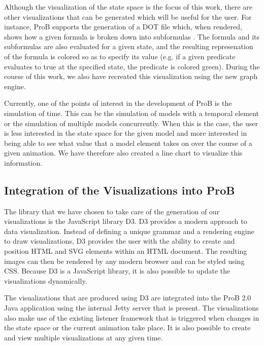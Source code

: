 Although the visualization of the state space is the focus of this work, there are other visualizations that can be generated which will be useful for the user. For instance, ProB supports the generation of a DOT file which, when rendered, shows how a given formula is broken down into subformulas \cite{LeSaBeLu08_228}. The formula and its subformulas are also evaluated for a given state, and the resulting represenation of the formula is colored so as to specify its value (e.g. if a given predicate evaluates to true at the specified state, the predicate is colored green). During the course of this work, we also have recreated this visualization using the new graph engine.

Currently, one of the points of interest in the development of ProB is the simulation of time. This can be the simulation of models with a temporal element or the simulation of multiple models concurrently. When this is the case, the user is less interested in the state space for the given model and more interested in being able to see what value that a model element takes on over the course of a given animation. We have therefore also created a line chart to visualize this information.

\subsection{Integration of the Visualizations into ProB}

The library that we have chosen to take care of the generation of our visualizations is the JavaScript library D3. D3 provides a modern approach to data visualization. Instead of defining a unique grammar and a rendering engine to draw visualizations, D3 provides the user with the ability to create and position HTML and SVG elements within an HTML document. The resulting images can then be rendered by any modern browser and can be styled using CSS. Because D3 is a JavaScript library, it is also possible to update the visualizations dynamically. 

The visualizations that are produced using D3 are integrated into the ProB 2.0 Java application using the internal Jetty server that is present. The visualizations also make use of the existing listener framework that is triggered when changes in the state space or the current animation take place. It is also possible to create and view multiple visualizations at any given time. 